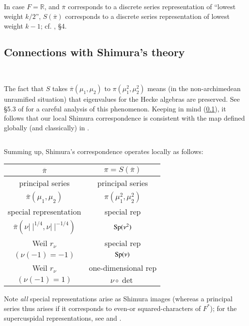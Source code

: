\subsection{}\label{art1-sec7.4}
In case $F=\mathbb{R}$, and $\overline{\pi}$ corresponds to a discrete series representation of ``lowest weight $k/2$'', $S(\overline{\pi})$ corresponds to a discrete series representation of lowest weight $k-1$; cf. \cite{Ge}, \S4.

\subsection{Connections with Shimura's theory}\label{art1-sec7.5}
~

The fact that $S$ takes $\overline{\pi}(\mu_{1},\mu_{2})$ to $\pi(\mu^{2}_{1},\mu^{2}_{2})$ means (in the non-archi\-medean unramified situation) that eigenvalues for the Hecke algebras are preserved. See \S5.3 of \cite{Ge} for a careful analysis of this phenomenon. Keeping in mind (\ref{art1-sec7.4}), it follows that our local Shimura correspondence is consistent with the map defined globally (and classically) in \cite{Shim}.

\subsection{}\label{art1-sec7.6}\pageoriginale
Summing up, Shimura's correspondence operates locally as follows:
\begin{center}
\tabcolsep=10pt
\renewcommand{\arraystretch}{1.1}
\begin{tabular}{c|c}
$\overline{\pi}$ & $\pi=S(\overline{\pi})$\\
\hline
principal series & principal series\\
$\overline{\pi}(\mu_{1},\mu_{2})$ & $\pi(\mu^{2}_{1},\mu^{2}_{2})$\\
\hline
special representation & special rep\\
$\overline{\pi}(\nu|~|^{1/4},\nu|~|^{-1/4})$ & $\operatorname{Sp}(\nu^{2})$\\
\hline
Weil $r_{\nu}$ & special rep\\
$(\nu(-1)=-1)$ & $\operatorname{Sp}(\nu)$\\
\hline
Weil $r_{\nu}$ & one-dimensional rep\\
$(\nu(-1)=1)$ & $\nu\circ \det$
\end{tabular}
\end{center}
Note {\em all} special representations arise as Shimura images (whereas a principal series thus arises if it corresponds to even-or squared-characters of $F^{*}$); for the supercuspidal representations, see \cite{Flicker} and \cite{Meister}.

